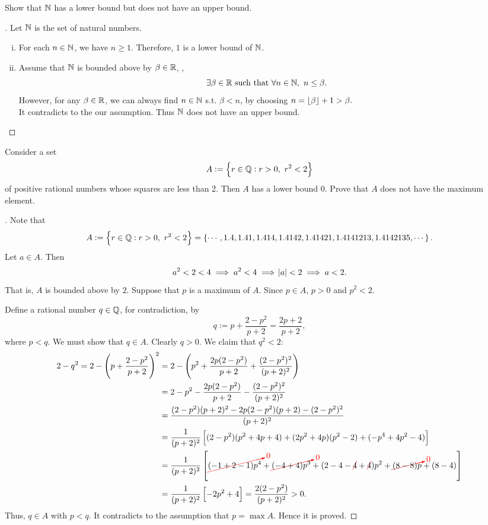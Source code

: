 \documentclass[11pt,openany]{article}
\begin{document}
\vfill
\begin{exercise*}
	Show that $\mathbb{N}$ has a lower bound but does not have an upper bound.
	\begin{proof}[\sol]
		Let $\mathbb{N}$ is the set of natural numbers. \begin{enumerate}[(i)]
			\item For each $n\in\mathbb{N}$, we have $n\geq 1$. Therefore, $1$ is a lower bound of $\mathbb{N}$.
			\item Assume that $\mathbb{N}$ is bounded above by $\beta\in\mathbb{R}$, \ie, \[
			\exists \beta\in\mathbb{R}\ \text{such that}\ \forall n\in\mathbb{N},\ n\leq\beta.
			\]  However, for any $\beta\in\mathbb{R}$, we can always find $n\in\mathbb{N}$ s.t. $\beta < n$, by choosing $n=\lfloor\beta\rfloor + 1 > \beta.$\\ It contradicts to the our assumption. Thus $\mathbb{N}$ does not have an upper bound.
		\end{enumerate}
	\end{proof}
\end{exercise*}
\begin{exercise*}[\textcolor{violet}{$\star$}]
	Consider a set \[
	A:=\set{r\in\mathbb{Q}:r>0,\ r^2<2}
	\] of positive rational numbers whose squares are less than 2. Then $A$ has a lower bound $0$. Prove that $A$ does not have the maximum element.
	\begin{proof}[\sol]
		Note that \[
		A:=\set{r\in\mathbb{Q}:r>0,\ r^2<2}=\set{\cdots,1.4, 1.41, 1.414, 1.4142, 1.41421, 1.4141213, 1.4142135, \cdots}.
		\] Let $a\in A$. Then \[
		a^2<2<4\implies a^2<4\implies\abs{a}<2\implies a < 2.
		\] That is, $A$ is bounded above by $2$. Suppose that $p$ is a maximum of $A$. Since $p\in A$, $p>0$ and $p^2<2$. 
		\begin{center}
		
		\end{center}
		Define a rational number $q\in\mathbb{Q}$, for contradiction, by \[
		q:=p + \frac{2-p^2}{p+2}=\frac{2p+2}{p+2},	
		\] where $p<q$. We must show that $q\in A$. 
		\newpage
		\noindent Clearly $q>0$. We claim that $q^2<2$: \begin{align*}
			2-q^2=2-\left(p + \frac{2-p^2}{p+2}\right)^2
			&=2-\left(p^2+\frac{2p(2-p^2)}{p+2}+\frac{(2-p^2)^2}{(p+2)^2}\right) \\
			&=2-p^2-\frac{2p(2-p^2)}{p+2}-\frac{(2-p^2)^2}{(p+2)^2} \\
			&=\frac{(2-p^2)(p+2)^2-2p(2-p^2)(p+2)-(2-p^2)^2}{(p+2)^2} \\
			&=\frac{1}{(p+2)^2}\left[(2-p^2)(p^2+4p+4)+(2p^2+4p)(p^2-2)+(-p^4+4p^2-4)\right] \\
			&=\frac{1}{(p+2)^2}\left[\crossout[red]{0}{(-1+2-1)p^4}+\crossout[red]{0}{(-4+4)p^3}+(2-4-\ncrossout[red]{4}+\ncrossout[red]{4})p^2+\crossout[red]{0}{(8-8)p}+(8-4)\right] \\
			&=\frac{1}{(p+2)^2}\left[-2p^2+4\right] =\frac{2(2-p^2)}{(p+2)^2}>0.
			\end{align*}
		Thus, $q\in A$ with $p<q$. It contradicts to the assumption that $p=\max A$. Hence it is proved.
	\end{proof}
\end{exercise*}
\end{document}
